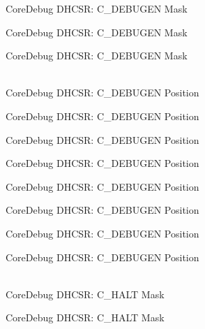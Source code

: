 \begin{DoxyRefList}
\label{deprecated__deprecated000402}%
%
Core\+Debug DHCSR:\+ C\+\_\+\+DEBUGEN Mask 

\label{deprecated__deprecated000491}%
%
Core\+Debug DHCSR:\+ C\+\_\+\+DEBUGEN Mask 

\label{deprecated__deprecated000593}%
%
Core\+Debug DHCSR:\+ C\+\_\+\+DEBUGEN Mask  
\item[{\parbox[t]{\linewidth}{Global \doxylink{group__CMSIS__CoreDebug_gab557abb5b172b74d2cf44efb9d824e4e}{Core\+Debug\+\_\+\+DHCSR\+\_\+\+C\+\_\+\+DEBUGEN\+\_\+\+Pos} }}]\hfill \\
\label{deprecated__deprecated000039}%
%
Core\+Debug DHCSR:\+ C\+\_\+\+DEBUGEN Position 

\label{deprecated__deprecated000127}%
%
Core\+Debug DHCSR:\+ C\+\_\+\+DEBUGEN Position 

\label{deprecated__deprecated000183}%
%
Core\+Debug DHCSR:\+ C\+\_\+\+DEBUGEN Position 

\label{deprecated__deprecated000266}%
%
Core\+Debug DHCSR:\+ C\+\_\+\+DEBUGEN Position 

\label{deprecated__deprecated000325}%
%
Core\+Debug DHCSR:\+ C\+\_\+\+DEBUGEN Position 

\label{deprecated__deprecated000401}%
%
Core\+Debug DHCSR:\+ C\+\_\+\+DEBUGEN Position 

\label{deprecated__deprecated000490}%
%
Core\+Debug DHCSR:\+ C\+\_\+\+DEBUGEN Position 

\label{deprecated__deprecated000592}%
%
Core\+Debug DHCSR:\+ C\+\_\+\+DEBUGEN Position  
\item[{\parbox[t]{\linewidth}{Global \doxylink{group__CMSIS__CoreDebug_ga1d905a3aa594eb2e8bb78bcc4da05b3f}{Core\+Debug\+\_\+\+DHCSR\+\_\+\+C\+\_\+\+HALT\+\_\+\+Msk} }}]\hfill \\
\label{deprecated__deprecated000038}%
%
Core\+Debug DHCSR:\+ C\+\_\+\+HALT Mask 

\label{deprecated__deprecated000126}%
%
Core\+Debug DHCSR:\+ C\+\_\+\+HALT Mask 


\end{DoxyRefList}
